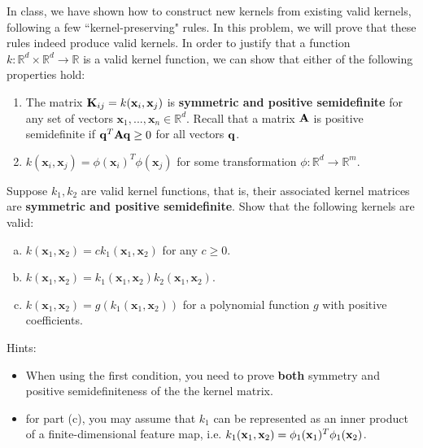 \documentclass[11pt]{article}
\begin{document}
In class, we have shown how to construct new kernels from existing valid kernels, following a few ``kernel-preserving" rules. In this problem, we will prove that these rules indeed produce valid kernels. 
	In order to justify that a function $k: \mathbb{R}^d \times \mathbb{R}^d \rightarrow \mathbb{R}$ is a valid kernel function, we can show that either of the following properties hold:
    \begin{enumerate}
        \item The matrix $\bold K_{ij} = k(\mathbf{x}_i, \mathbf{x}_j)$ is \textbf{symmetric and positive semidefinite} for any set of vectors $\mathbf{x}_1, ..., \mathbf{x}_n \in \mathbb{R}^d$.
        Recall that a matrix $\bold A$ is positive semidefinite if $\bold q^T \bold A \bold q \geq 0$ for all vectors $\bold q$.
        \item $k(\mathbf{x}_i, \mathbf{x}_j) = \phi(\mathbf{x}_i)^T \phi(\mathbf{x}_j)$ for some transformation
        $\phi:\mathbb{R}^d \to \mathbb{R}^m$.
    \end{enumerate}
    Suppose $k_1, k_2$ are valid kernel functions, that is, their associated kernel matrices are \textbf{symmetric and positive semidefinite}.
    Show that the following kernels are valid: 
	\begin{enumerate}[(a)]
		\item $k(\mathbf{x}_1, \mathbf{x}_2) = c k_1(\mathbf{x}_1, \mathbf{x}_2)$ for any $c \geq 0$.
		\item $k(\mathbf{x}_1, \mathbf{x}_2) = k_1(\mathbf{x}_1, \mathbf{x}_2) k_2(\mathbf{x}_1, \mathbf{x}_2)$.
		\item $k(\mathbf{x}_1, \mathbf{x}_2) = g( k_1(\mathbf{x}_1, \mathbf{x}_2) )$ for a polynomial function $g$ with positive coefficients. 
	\end{enumerate} 
Hints:
\begin{itemize}
\item When using the first condition, you need to prove \textbf{both} symmetry and positive semidefiniteness of the the kernel matrix.
\item for part (c), you may assume that $k_1$ can be represented as an inner product of a finite-dimensional feature map, i.e. $k_1(\bold x_1, \bold x_2) = \phi_1(\bold x_1)^T \phi_1(\bold x_2)$. 
\end{itemize}
\end{document}
